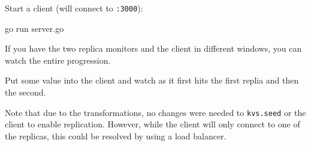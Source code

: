 \documentclass[a5paper,12pt,onecolumn]{article}
\def\code#1{\mbox{\lstinline{#1}}}
\begin{document}
Start a client (will connect to \code{:3000}):

\begin{cli}
go run server.go
\end{cli}

If you have the two replica monitors and the client in different windows, you can watch the entire progression.

Put some value into the client and watch as it first hits the first replia and then the second.

Note that due to the transformations, no changes were needed to \code{kvs.seed} or the client to enable replication. However, while the client will only connect to one of the replicas, this could be resolved by using a load balancer.
\end{document}
